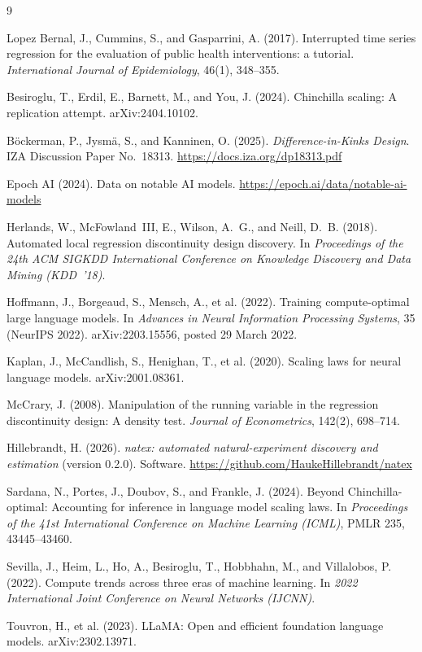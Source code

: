 \documentclass[11pt]{article}
\begin{document}
\scriptsize
\begin{thebibliography}{9}
\setlength{\itemsep}{2pt}\setlength{\parskip}{0pt}

Lopez Bernal, J., Cummins, S., and Gasparrini, A. (2017).
Interrupted time series regression for the evaluation of public health
interventions: a tutorial.
\emph{International Journal of Epidemiology}, 46(1), 348--355.

Besiroglu, T., Erdil, E., Barnett, M., and You, J. (2024).
Chinchilla scaling: A replication attempt.
arXiv:2404.10102.

B\"ockerman, P., Jysm\"a, S., and Kanninen, O. (2025).
\emph{Difference-in-Kinks Design}.
IZA Discussion Paper No.~18313.
\url{https://docs.iza.org/dp18313.pdf}

Epoch AI (2024).
Data on notable AI models.
\url{https://epoch.ai/data/notable-ai-models}

Herlands, W., McFowland~III, E., Wilson, A.~G., and Neill, D.~B. (2018).
Automated local regression discontinuity design discovery.
In \emph{Proceedings of the 24th ACM SIGKDD International Conference on
Knowledge Discovery and Data Mining (KDD~'18)}.

Hoffmann, J., Borgeaud, S., Mensch, A., et al. (2022).
Training compute-optimal large language models.
In \emph{Advances in Neural Information Processing Systems}, 35 (NeurIPS 2022).
arXiv:2203.15556, posted 29 March 2022.

Kaplan, J., McCandlish, S., Henighan, T., et al. (2020).
Scaling laws for neural language models.
arXiv:2001.08361.

McCrary, J. (2008).
Manipulation of the running variable in the regression discontinuity design:
A density test.
\emph{Journal of Econometrics}, 142(2), 698--714.

Hillebrandt, H. (2026).
\emph{natex: automated natural-experiment discovery and estimation} (version
0.2.0). Software.
\url{https://github.com/HaukeHillebrandt/natex}

Sardana, N., Portes, J., Doubov, S., and Frankle, J. (2024).
Beyond Chinchilla-optimal: Accounting for inference in language model scaling
laws.
In \emph{Proceedings of the 41st International Conference on Machine Learning
(ICML)}, PMLR 235, 43445--43460.

Sevilla, J., Heim, L., Ho, A., Besiroglu, T., Hobbhahn, M., and Villalobos, P.
(2022).
Compute trends across three eras of machine learning.
In \emph{2022 International Joint Conference on Neural Networks (IJCNN)}.

Touvron, H., et al. (2023).
LLaMA: Open and efficient foundation language models. arXiv:2302.13971.

\end{thebibliography}
\end{document}
